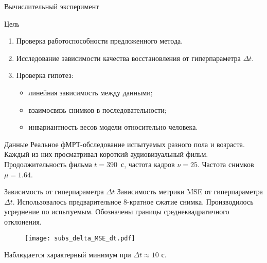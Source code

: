 \documentclass{beamer}
\begin{document}
\begin{frame}{Вычислительный эксперимент}
    \begin{block}{Цель}
        \begin{enumerate}
            \item Проверка работоспособности предложенного метода.
            \item Исследование зависимости качества восстановления от гиперпараметра $\Delta t$.
            \item Проверка гипотез:
                    \begin{itemize}
                        \item линейная зависимость между данными;
                        \item взаимосвязь снимков в последовательности;
                        \item инвариантность весов модели относительно человека.
                    \end{itemize}
        \end{enumerate}
    \end{block}
    \begin{block}{Данные}
        Реальное фМРТ-обследование испытуемых разного пола и возраста.
        Каждый из них просматривал короткий аудиовизуальный фильм.
        Продолжительность фильма $t = 390$~с, частота кадров $\nu = 25$.
        Частота снимков $\mu = 1.64$.
    \end{block}
\end{frame}
\begin{frame}{Зависимость от гиперпараметра $\Delta t$}
    Зависимость метрики MSE от гиперпараметра $\Delta t$.
    Использовалось предварительное 8-кратное сжатие снимка.
    Производилось усреднение по испытуемым.
	Обозначены границы среднеквадратичного отклонения.
    \begin{figure}[h!]
		\centering
		\texttt{[image: subs\_delta\_MSE\_dt.pdf]}
		\label{fig:3}
	\end{figure}
    Наблюдается характерный минимум при $\Delta t \approx 10 \text{ с}$.
\end{frame}
\end{document}
